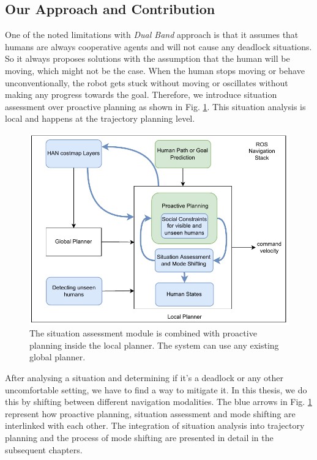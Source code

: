 \subsection{Our Approach and Contribution}
One of the noted limitations with \textit{Dual Band} approach is that it assumes that humans are always cooperative agents and will not cause any deadlock situations. So it always proposes solutions with the assumption that the human will be moving, which might not be the case. When the human stops moving or behave unconventionally, the robot gets stuck without moving or oscillates without making any progress towards the goal. Therefore, we introduce situation assessment over proactive planning as shown in Fig. \ref{fig:full_contrib}. This situation analysis is local and happens at the trajectory planning level. 
\begin{figure}[h!]
    \centering
    \includegraphics[width=0.9\columnwidth]{images/contrib_new.pdf}    \caption{The situation assessment module is combined with proactive planning inside the local planner. The system can use any existing global planner.}
    \label{fig:full_contrib}
\end{figure}
After analysing a situation and determining if it's a deadlock or any other uncomfortable setting, we have to find a way to mitigate it. In this thesis, we do this by shifting between different navigation modalities. The blue arrows in Fig. \ref{fig:full_contrib} represent how proactive planning, situation assessment and mode shifting are interlinked with each other. The integration of situation analysis into trajectory planning and the process of mode shifting are presented in detail in the subsequent chapters.

